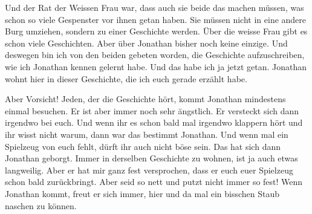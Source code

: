 \begin{mdframed}[style=mystyle]
Und der Rat der Weissen Frau war, dass auch sie beide das machen müssen, was schon so viele Gespenster vor ihnen getan haben. Sie müssen nicht in eine andere Burg umziehen, sondern zu einer Geschichte werden. Über die weisse Frau gibt es schon viele Geschichten. Aber über Jonathan bisher noch keine einzige. Und deswegen bin ich von den beiden gebeten worden, die Geschichte aufzuschreiben, wie ich Jonathan kennen gelernt habe. Und das habe ich ja jetzt getan. Jonathan wohnt hier in dieser Geschichte, die ich euch gerade erzählt habe. 

Aber Vorsicht! Jeden, der die Geschichte hört, kommt Jonathan mindestens einmal besuchen. Er ist aber immer noch sehr ängstlich. Er versteckt sich dann irgendwo bei euch. Und wenn ihr es schon bald mal irgendwo klappern hört und ihr wisst nicht warum, dann war das bestimmt Jonathan. Und wenn mal ein Spielzeug von euch fehlt, dürft ihr auch nicht böse sein. Das hat sich dann Jonathan geborgt. Immer in derselben Geschichte zu wohnen, ist ja auch etwas langweilig. Aber er hat mir ganz fest versprochen, dass er euch euer Spielzeug schon bald zurückbringt. Aber seid so nett und putzt nicht immer so fest! Wenn Jonathan kommt, freut er sich immer, hier und da mal ein bisschen Staub naschen zu können. \hfill {\color{DeepPink}\decofourleft}
\end{mdframed}

